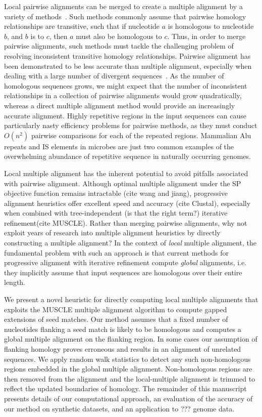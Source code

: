 \documentclass{llncs}
\begin{document}
Local pairwise alignments can be merged to create a multiple alignment by a variety of methods~\cite{multiz,repeatgluer,aba,dialign...}. Such methods commonly assume that pairwise homology relationships are transitive, such that if nucleotide $a$ is homologous to nucleotide $b$, and $b$ is to $c$, then $a$ must also be homologous to $c$.  Thus, in order to merge pairwise alignments, such methods must tackle the challenging problem of resolving inconsistent transitive homology relationships.  Pairwise alignment has been demonstrated to be less accurate than multiple alignment, especially when dealing with a large number of divergent sequences~\cite{MLAGANpaper,AuberGene,others?,...}.  As the number of homologous sequences grows, we might expect that the number of inconsistent relationships in a collection of pairwise alignments would grow quadratically, whereas a direct multiple alignment method would provide an increasingly accurate alignment.  Highly repetitive regions in the input sequences can cause particularly nasty efficiency problems for pairwise methods, as they must conduct $O(n^{2})$ pairwise comparisons for each of the repeated regions.  Mammalian Alu repeats and IS elements in microbes are just two common examples of the overwhelming abundance of repetitive sequence in naturally occurring genomes.

Local multiple alignment has the inherent potential to avoid pitfalls associated with pairwise alignment. Although optimal multiple alignment under the SP objective function remains intractable (cite wang and jiang), progressive alignment heuristics offer excellent speed and accuracy (cite Clustal), especially when combined with tree-independent (is that the right term?) iterative refinement(cite MUSCLE). Rather than merging pairwise alignments, why not exploit years of research into multiple alignment heuristics by directly constructing a multiple alignment?   In the context of \textit{local} multiple alignment, the fundamental problem with such an approach is that current methods for progressive alignment with iterative refinement compute \textit{global} alignments, i.e. they implicitly assume that input sequences are homologous over their entire length.

We present a novel heuristic for directly computing local multiple alignments that exploits the MUSCLE multiple alignment algorithm to compute gapped extensions of seed matches.  Our method assumes that a fixed number of nucleotides flanking a seed match is likely to be homologous and computes a global multiple alignment on the flanking region.  In some cases our assumption of flanking homology proves erroneous and results in an alignment of unrelated sequences.  We apply random walk statistics to detect any such non-homologous regions embedded in the global multiple alignment.  Non-homologous regions are then removed from the alignment and the local-multiple alignment is trimmed to reflect the updated boundaries of homology.  The remainder of this manuscript presents details of our computational approach, an evaluation of the accuracy of our method on synthetic datasets, and an application to ??? genome data.
\end{document}

